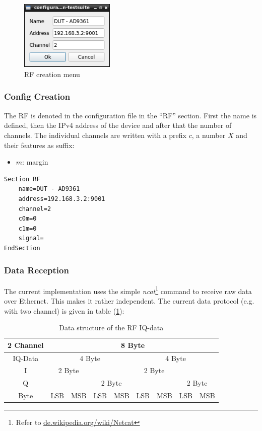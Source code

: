 \documentclass[10pt,a4paper]{article}
\begin{document}
		\begin{figure}[H]
\centering
\includegraphics[width=0.4\textwidth]{./6_RF_menu.png}
\caption{RF creation menu}
\label{f:rf_menu}
		\end{figure}
			
		\subsubsection{Config Creation}
				
		The RF is denoted in the configuration file in the \enquote{RF} section. First the name is defined, then the IPv4 address of the device and after that the number of channels. The individual channels are written with a prefix $c$, a number $X$ and their features as suffix:
	
	\begin{itemize}
	\item $m$: margin
	\end{itemize}
	
\begin{lstlisting}[caption=RF Config]
Section RF
	name=DUT - AD9361
	address=192.168.3.2:9001
	channel=2
	c0m=0
	c1m=0
	signal=
EndSection
\end{lstlisting}
	
		\subsubsection{Data Reception}
		The current implementation uses the simple \textit{ncat}\footnote{Refer to \url{de.wikipedia.org/wiki/Netcat}} command to receive raw data over Ethernet. This makes it rather independent. The current data protocol (e.g. with two channel) is given in table (\ref{t:rf_data}):
		
		\begin{table}[H]
		\centering
		\begin{tabular}{c|cc|cc|cc|cc}
		\toprule
		2 Channel	& \multicolumn{8}{c}{8 Byte}\\ \midrule
		IQ-Data		& \multicolumn{4}{c|}{4 Byte} & \multicolumn{4}{c}{4 Byte} \\ \hline 
		I	& \multicolumn{2}{c}{2 Byte} & \multicolumn{2}{c|}{} & \multicolumn{2}{c}{2 Byte} & \multicolumn{2}{c}{} \\ 
		Q	& \multicolumn{2}{c}{} & \multicolumn{2}{c|}{2 Byte} & \multicolumn{2}{c}{} & \multicolumn{2}{c}{2 Byte} \\  \hline
		Byte		& LSB & MSB & LSB & MSB & LSB & MSB & LSB & MSB \\ \bottomrule
		\end{tabular}
		\caption{Data structure of the RF IQ-data}
		\label{t:rf_data}
		\end{table}
		
\end{document}
